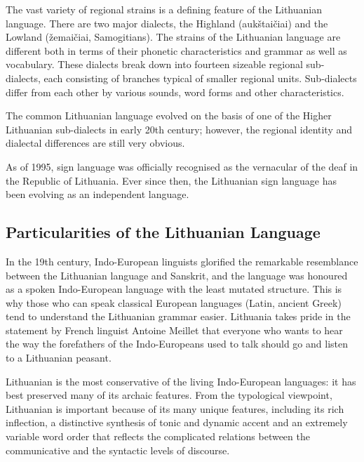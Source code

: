 \begin{multicols}{2}
    The vast variety of regional strains is a defining feature of the Lithuanian language. There are two major dialects, the Highland (aukštaičiai) and the Lowland (žemaičiai, Samogitians). The strains of the Lithuanian language are different both in terms of their phonetic characteristics and grammar as well as vocabulary. These dialects break down into fourteen sizeable regional sub-dialects, each consisting of branches typical of smaller regional units. Sub-dialects differ from each other by various sounds, word forms and other characteristics.

The common Lithuanian language evolved on the basis of one of the Higher Lithuanian sub-dialects in early 20th century; however, the regional identity and dialectal differences are still very obvious.

As of 1995, sign language was officially recognised as the vernacular of the deaf in the Republic of Lithuania. Ever since then, the Lithuanian sign language has been evolving as an independent language.

\subsection{Particularities of the Lithuanian  Language}

In the 19th century, Indo-European linguists glorified the remarkable resemblance between the Lithuanian language and Sanskrit, and the language was honoured as a spoken Indo-European language with the least mutated structure. This is why those who can speak classical European languages (Latin, ancient Greek) tend to understand the Lithuanian grammar easier. Lithuania takes pride in the statement by French linguist Antoine Meillet that everyone who wants to hear the way the forefathers of the Indo-Europeans used to talk should go and listen to a Lithuanian peasant.


Lithuanian is the most conservative of the living Indo-European languages: it has best preserved many of its archaic features. From the typological viewpoint, Lithuanian is important because of its many unique features, including its rich inflection, a distinctive synthesis of tonic and dynamic accent and an extremely variable word order that reflects the complicated relations between the communicative and the syntactic levels of discourse.


\end{multicols}

